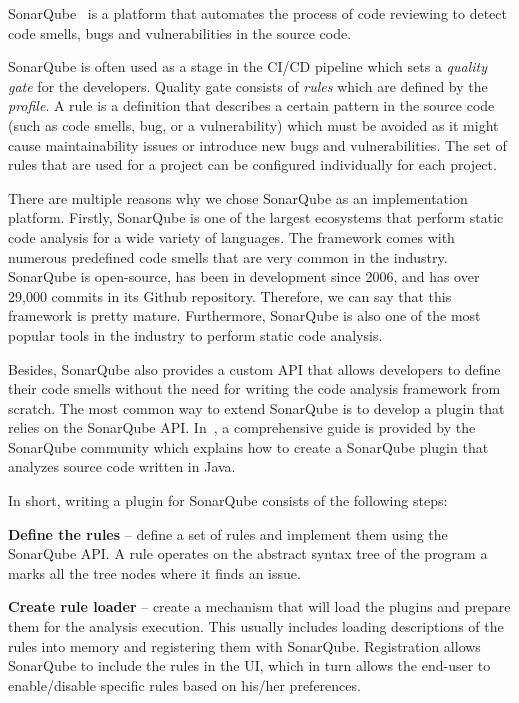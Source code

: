 SonarQube~\cite{sonar} is a platform that automates the process of code reviewing to detect code smells,
bugs and vulnerabilities in the source code.

SonarQube is often used as a stage in the CI/CD pipeline which sets a \textit{quality gate} for the developers.
Quality gate consists of \textit{rules} which are defined by the \textit{profile}.
A rule is a definition that describes a certain pattern in the source code (such as code smells, bug, or a vulnerability) which
must be avoided as it might cause maintainability issues or introduce new bugs and vulnerabilities.
The set of rules that are used for a project can be configured individually for each project.

There are multiple reasons why we chose SonarQube as an implementation platform.
Firstly, SonarQube is one of the largest ecosystems that perform static code analysis for a wide variety of languages.
The framework comes with numerous predefined code smells that are very common in the industry.
SonarQube is open-source, has been in development since 2006, and has over 29,000 commits in its Github repository\cite{sonar-repo}.
Therefore, we can say that this framework is pretty mature.
Furthermore, SonarQube is also one of the most popular tools in the industry to perform static code analysis.

Besides, SonarQube also provides a custom API that allows developers to define their code smells without
the need for writing the code analysis framework from scratch.
The most common way to extend SonarQube is to develop a plugin that relies on the SonarQube API\@.
In~\cite{sonar_plugin_tutorial}, a comprehensive guide is provided by the SonarQube community which explains how to create
a SonarQube plugin that analyzes source code written in Java.

In short, writing a plugin for SonarQube consists of the following steps:

\begin{flushleft}
    \textbf{Define the rules} -- define a set of rules and implement them using the SonarQube API\@.
    A rule operates on the abstract syntax tree of the program a marks all the tree nodes where it finds an issue.
\end{flushleft}

\begin{flushleft}
    \textbf{Create rule loader} -- create a mechanism that will load the plugins and prepare them for the analysis execution.
    This usually includes loading descriptions of the rules into memory and registering them with SonarQube.
    Registration allows SonarQube to include the rules in the UI, which in turn allows the end-user to enable/disable specific rules based on his/her preferences.
\end{flushleft}

